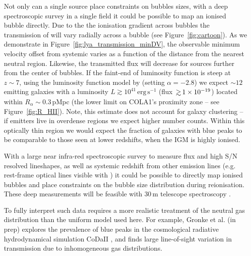 \documentclass[fleqn,usenatbib]{mnras}
\begin{document}
Not only can a single source place constraints on bubbles sizes, with a deep spectroscopic survey in a single field it could be possible to map an ionised bubble directly. Due to the the ionisation gradient across bubbles the transmission of \lya will vary radially across a bubble (see Figure~\ref{fig:cartoon}). As we demonstrate in Figure~\ref{fig:lya_transmission_minDV}, the observable minimum velocity offset from systemic varies as a function of the distance from the nearest neutral region. Likewise, the transmitted \lya flux will decrease for sources further from the center of bubbles. 
If the faint-end of \lya luminosity function is steep \citep[e.g., $\alpha\sim-2.8$][]{Drake2017} at $z\sim7$, using the luminosity function model by \citet{Gronke2015} (setting $\alpha=-2.8$) we expect $\sim 12$ \lya emitting galaxies with a luminosity $L\gtrsim 10^{41}\,\mathrm{erg}\,\mathrm{s}^{-1}$ (flux $\simgt 1\times10^{-19}$\fdens) located within $R_\alpha \sim 0.3\,$pMpc (the lower limit on COLA1's proximity zone -- see Figure~\ref{fig:R_HII}). Note, this estimate does not account for galaxy clustering -- if \lya emitters live in overdense regions \citep{Ouchi2017} we expect higher number counts. Within this optically thin region we would expect the fraction of galaxies with blue \lya peaks to be comparable to those seen at lower redshifts, when the IGM is highly ionised. 

With a large near infra-red spectroscopic survey to measure \lya flux and high S/N resolved lineshapes, as well as systemic redshift from other emission lines (e.g. rest-frame optical lines visible with \JWST)  it could be possible to directly map ionised bubbles and place constraints on the bubble size distribution during reionisation. These deep measurements will be feasible with 30\,m telescope spectroscopy \citep[e.g., E-ELT/MOSAIC is expected to reach $1\times10^{-19}$\fdens in 40 hrs,][]{Evans2015}.

To fully interpret such data requires a more realistic treatment of the neutral gas distribution than the uniform model used here. For example, Gronke et al. (in prep) explores the prevalence of blue \lya peaks in the cosmological radiative hydrodynamical simulation CoDaII \citep{Ocvirk2018}, and finds large line-of-sight variation in \lya transmission due to inhomogeneous gas distributions.
\end{document}
